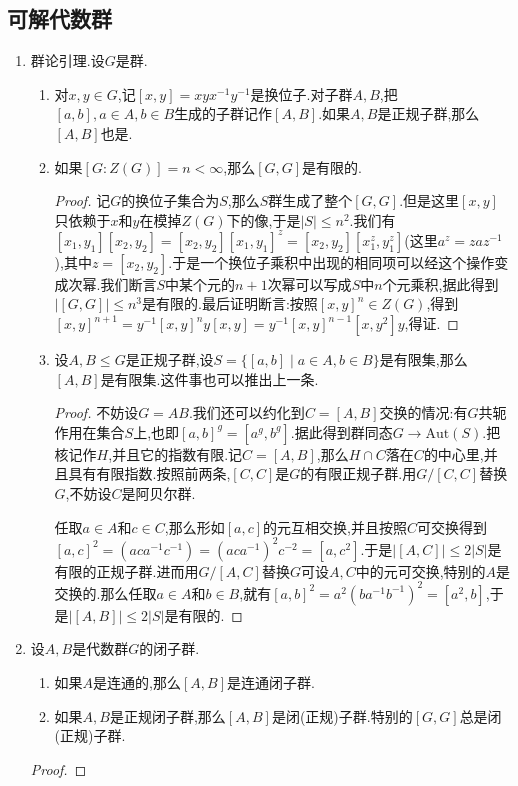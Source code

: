 \subsection{可解代数群}
\begin{enumerate}
	\item 群论引理.设$G$是群.
	\begin{enumerate}[(1)]
		\item 对$x,y\in G$,记$[x,y]=xyx^{-1}y^{-1}$是换位子.对子群$A,B$,把$[a,b],a\in A,b\in B$生成的子群记作$[A,B]$.如果$A,B$是正规子群,那么$[A,B]$也是.
		\item 如果$[G:Z(G)]=n<\infty$,那么$[G,G]$是有限的.
		\begin{proof}
			
			记$G$的换位子集合为$S$,那么$S$群生成了整个$[G,G]$.但是这里$[x,y]$只依赖于$x$和$y$在模掉$Z(G)$下的像,于是$|S|\le n^2$.我们有$[x_1,y_1][x_2,y_2]=[x_2,y_2][x_1,y_1]^z=[x_2,y_2][x_1^z,y_1^z]$(这里$a^z=zaz^{-1}$),其中$z=[x_2,y_2]$.于是一个换位子乘积中出现的相同项可以经这个操作变成次幂.我们断言$S$中某个元的$n+1$次幂可以写成$S$中$n$个元乘积,据此得到$|[G,G]|\le n^3$是有限的.最后证明断言:按照$[x,y]^n\in Z(G)$,得到$[x,y]^{n+1}=y^{-1}[x,y]^ny[x,y]=y^{-1}[x,y]^{n-1}[x,y^2]y$,得证.
		\end{proof}
		\item 设$A,B\le G$是正规子群,设$S=\{[a,b]\mid a\in A,b\in B\}$是有限集,那么$[A,B]$是有限集.这件事也可以推出上一条.
		\begin{proof}
			
			不妨设$G=AB$.我们还可以约化到$C=[A,B]$交换的情况:有$G$共轭作用在集合$S$上,也即$[a,b]^g=[a^g,b^g]$.据此得到群同态$G\to\mathrm{Aut}(S)$.把核记作$H$,并且它的指数有限.记$C=[A,B]$,那么$H\cap C$落在$C$的中心里,并且具有有限指数.按照前两条,$[C,C]$是$G$的有限正规子群.用$G/[C,C]$替换$G$,不妨设$C$是阿贝尔群.
			
			\qquad
			
			任取$a\in A$和$c\in C$,那么形如$[a,c]$的元互相交换,并且按照$C$可交换得到$[a,c]^2=(aca^{-1}c^{-1})=(aca^{-1})^2c^{-2}=[a,c^2]$.于是$|[A,C]|\le2|S|$是有限的正规子群.进而用$G/[A,C]$替换$G$可设$A,C$中的元可交换,特别的$A$是交换的.那么任取$a\in A$和$b\in B$,就有$[a,b]^2=a^2(ba^{-1}b^{-1})^2=[a^2,b]$,于是$|[A,B]|\le2|S|$是有限的.
		\end{proof}
	\end{enumerate}
    \item 设$A,B$是代数群$G$的闭子群.
    \begin{enumerate}[(1)]
    	\item 如果$A$是连通的,那么$[A,B]$是连通闭子群.
    	\item 如果$A,B$是正规闭子群,那么$[A,B]$是闭(正规)子群.特别的$[G,G]$总是闭(正规)子群.
    \end{enumerate}
    \begin{proof}
    	

\end{proof}
\end{enumerate}
